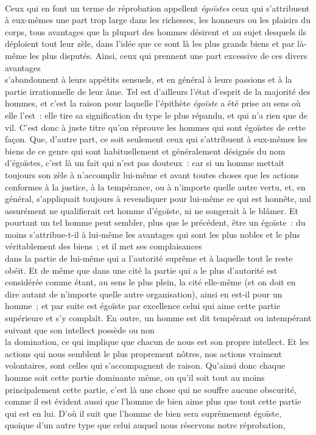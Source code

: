\documentclass[french,twoside]{book} %
\begin{document}
\\
Ceux qui en font un terme de réprobation appellent {\itshape égoïstes} ceux qui s’attribuent à eux-mêmes une part trop large dans les richesses, les honneurs ou les plaisirs du corps, tous avantages que la plupart des hommes désirent et au sujet desquels ils déploient tout leur zèle, dans l’idée que ce sont là les plus grands biens et par là-même les plus disputés. Ainsi, ceux qui prennent une part excessive de ces divers avantages \\
s’abandonnent à leurs appétits sensuels, et en général à leurs passions et à la partie irrationnelle de leur âme. Tel est d’ailleurs l’état d’esprit de la majorité des hommes, et c’est la raison pour laquelle l’épithète {\itshape égoïste} a été prise au sens où elle l’est : elle tire sa signification du type le plus répandu, et qui n’a rien que de vil. C’est donc à juste titre qu’on réprouve les hommes qui sont égoïstes de cette façon. Que, d’autre part, ce soit seulement ceux qui s’attribuent à eux-mêmes les biens de ce genre qui sont habituellement et généralement désignés du nom \\
d’égoïstes, c’est là un fait qui n’est pas douteux : car si un homme mettait toujours son zèle à n’accomplir lui-même et avant toutes choses que les actions conformes à la justice, à la tempérance, ou à n’importe quelle autre vertu, et, en général, s’appliquait toujours à revendiquer pour lui-même ce qui est honnête, nul assurément ne qualifierait cet homme d’égoïste, ni ne songerait à le blâmer. Et pourtant un tel homme peut sembler, plus que le précédent, être un égoïste : du moins s’attribue-t-il à lui-même les avantages qui sont les plus nobles et le plus véritablement des biens ; et il met ses complaisances \\
dans la partie de lui-même qui a l’autorité suprême et à laquelle tout le reste obéit. Et de même que dans une cité la partie qui a le plus d’autorité est considérée comme étant, au sens le plus plein, la cité elle-même (et on doit en dire autant de n’importe quelle autre organisation), ainsi en est-il pour un homme ; et par suite est égoïste par excellence celui qui aime cette partie supérieure et s’y complaît. En outre, un homme est dit tempérant ou intempérant suivant que son intellect possède ou non \\
la domination, ce qui implique que chacun de nous est son propre intellect. Et les actions qui nous semblent le plus proprement  nôtres, nos actions vraiment volontaires, sont celles qui s’accompagnent de raison. Qu’ainsi donc chaque homme soit cette partie dominante même, ou qu’il soit tout au moins principalement cette partie, c’est là une chose qui ne souffre aucune obscurité, comme il est évident aussi que l’homme de bien aime plus que tout cette partie qui est en lui. D’où il suit que l’homme de bien sera suprêmement égoïste, quoique d’un autre type que celui auquel nous réservons notre réprobation, \\
\end{document}
